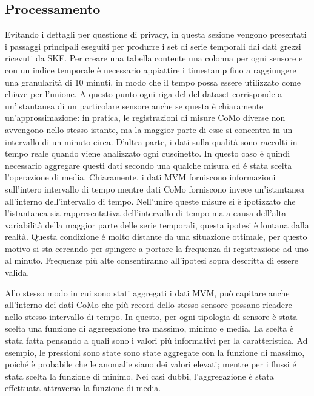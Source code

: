 \subsection{Processamento}
Evitando i dettagli per questione di privacy, in questa sezione vengono presentati i passaggi principali eseguiti per produrre i set di serie temporali dai dati grezzi ricevuti da SKF. 
Per creare una tabella contente una colonna per ogni sensore e con un indice temporale è necessario appiattire i timestamp fino a raggiungere una granularità di 10 minuti, in modo che il tempo possa essere utilizzato come chiave per l'unione. A questo punto ogni riga del del dataset corrisponde a un'istantanea di un particolare sensore anche se questa è chiaramente un'approssimazione: in pratica, le registrazioni di misure CoMo diverse non avvengono nello stesso istante, ma la maggior parte di esse si concentra in un intervallo di un minuto circa. 
D'altra parte, i dati sulla qualità sono raccolti in tempo reale quando viene analizzato ogni cuscinetto. In questo caso é quindi necessario aggregare questi dati secondo una qualche misura ed é stata scelta l'operazione di media.
Chiaramente, i dati MVM forniscono informazioni sull'intero intervallo di tempo mentre dati CoMo forniscono invece un'istantanea all'interno dell'intervallo di tempo.
Nell'unire queste misure si è ipotizzato che l'istantanea sia rappresentativa dell'intervallo di tempo ma a causa dell'alta variabilità della maggior parte delle serie temporali, questa ipotesi è lontana dalla realtà.
Questa condizione é molto distante da una situazione ottimale, per questo motivo si sta cercando per spingere a portare la frequenza di registrazione ad uno al minuto. Frequenze più alte consentiranno all'ipotesi sopra descritta di essere valida.

Allo stesso modo in cui sono stati aggregati i dati MVM, può capitare anche all'interno dei dati CoMo che più record dello stesso sensore possano ricadere nello stesso intervallo di tempo. In questo, per ogni tipologia di sensore è stata scelta una funzione di aggregazione tra massimo, minimo e media. La scelta è stata fatta pensando a quali sono i valori più informativi per la caratteristica. Ad esempio, le pressioni sono state sono state aggregate con la funzione di massimo, poiché è probabile che le anomalie siano dei valori elevati; mentre per i flussi é stata scelta la funzione di minimo. Nei casi dubbi, l'aggregazione è stata effettuata attraverso la funzione di media.

